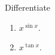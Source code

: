 Differentiate
\begin{enumerate}[ref={\fcProblemRef}]
\item \label{problemDifferentiatex^sinx} $x^{\sin x}$.
\item $x^{\tan x}$.
\end{enumerate}

